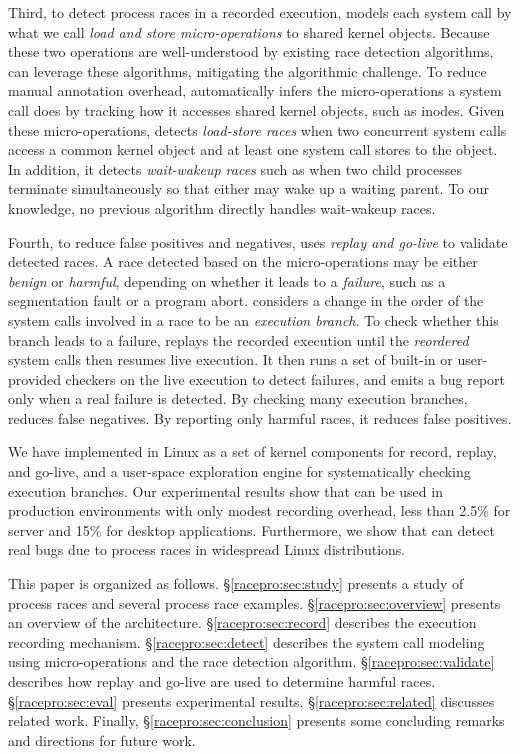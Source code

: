 Third, to detect process races in a recorded execution,
\racepro models each system call by what we call
\emph{load and store micro-operations} to shared kernel objects. 
Because these two operations are well-understood by existing race
detection algorithms, \racepro can leverage these
algorithms, mitigating the algorithmic challenge.  To reduce manual
annotation overhead, \racepro automatically infers
the micro-operations a system call does by tracking how it
accesses shared kernel objects, such as inodes.  
Given these micro-operations, \racepro detects \emph{load-store
races} when two concurrent system calls access a common kernel object
and at least one system call stores to the object.
In addition, it detects \emph{wait-wakeup races} such as
when two child processes terminate simultaneously 
so that either may wake up a waiting parent.
To our knowledge, no previous algorithm directly handles wait-wakeup races.

Fourth, to reduce false positives and negatives, \racepro uses 
\emph{replay and go-live} to validate detected races.
A race detected based on the micro-operations may be either \emph{benign}
or \emph{harmful}, depending on whether it leads to a \emph{failure}, such
as a segmentation fault or a program abort.
\racepro considers a change in the order of the system
calls involved in a race to be an \emph{execution branch}.  To check
whether this branch leads 
to a failure, \racepro replays the recorded execution until the \emph{reordered}
system calls then resumes live execution.  It then runs a set of built-in or
user-provided checkers on the live execution to detect failures,
and emits a bug report only when a real failure is detected.
By checking many execution branches,
\racepro reduces false negatives.  By reporting only harmful races, it
reduces false positives. 

We have implemented \racepro in Linux as a set of kernel components for
record, replay, and go-live, and a user-space exploration engine for
systematically checking execution branches.  Our experimental results
show that \racepro can be used in production environments with only
modest recording overhead, less than 2.5\% for server and 15\% for
desktop applications.  Furthermore, we show that \racepro can detect
\nracepro real bugs due to process races in widespread Linux
distributions. 

This paper is organized as follows.  \S\ref{racepro:sec:study} presents a
study of process races and several process race examples.
\S\ref{racepro:sec:overview} presents an overview of the \racepro architecture.
\S\ref{racepro:sec:record} describes the execution recording mechanism.
\S\ref{racepro:sec:detect} describes  the system call modeling using
micro-operations and the race detection algorithm.
\S\ref{racepro:sec:validate} describes how replay and go-live are used to
determine harmful races.  \S\ref{racepro:sec:eval} presents experimental
results.  \S\ref{racepro:sec:related} discusses related work.  Finally, 
\S\ref{racepro:sec:conclusion} presents some concluding remarks and directions
for future work.

